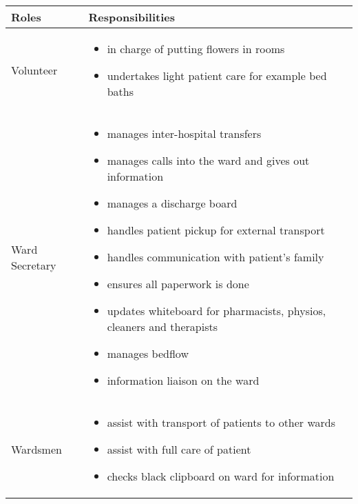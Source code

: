 \hfil\begin{tabular}{|p{5cm}|p{11cm}|}
\hline
{\hfil\bf Roles} & {\hfil\bf Responsibilities} \\
\hline
Volunteer & \vspace{-5mm}\begin{itemize}
\item in charge of putting flowers in rooms
\item undertakes light patient care for example bed baths
\end{itemize} \\
\hline
Ward Secretary & \vspace{-5mm}\begin{itemize}
\item manages inter-hospital transfers
\item manages calls into the ward and gives out information
\item manages a discharge board
\item handles patient pickup for external transport
\item handles communication with patient's family
\item ensures all paperwork is done
\item updates whiteboard for pharmacists, physios, cleaners and therapists
\item manages bedflow
\item information liaison on the ward
\end{itemize} \\
\hline
Wardsmen & \vspace{-5mm}\begin{itemize}
\item assist with transport of patients to other wards
\item assist with full care of patient
\item checks black clipboard on ward for information
\end{itemize} \\
\hline
\end{tabular}